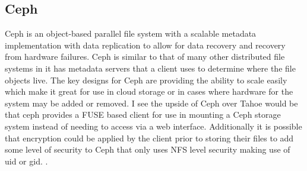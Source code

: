 \documentclass[11pt]{article}
\begin{document}
\subsection{Ceph}
Ceph is an object-based parallel file system with a scalable metadata implementation with data replication to allow for data recovery and recovery from hardware failures. Ceph is similar to that of many other distributed file systems in it has metadata servers that a client uses to determine where the file objects live. The key designs for Ceph are providing the ability to scale easily which make it great for use in cloud storage or in cases where hardware for the system may be added or removed. I see the upside of Ceph over Tahoe would be that ceph provides a FUSE based client for use in mounting a Ceph storage system instead of needing to access via a web interface. Additionally it is possible that encryption could be applied by the client prior to storing their files to add some level of security to Ceph that only uses NFS level security making use of uid or gid. 
\cite{Weil:2012p1035,Weil:2012p1010,Weil:2006p1273}.

\nocite{*}

\end{document}

